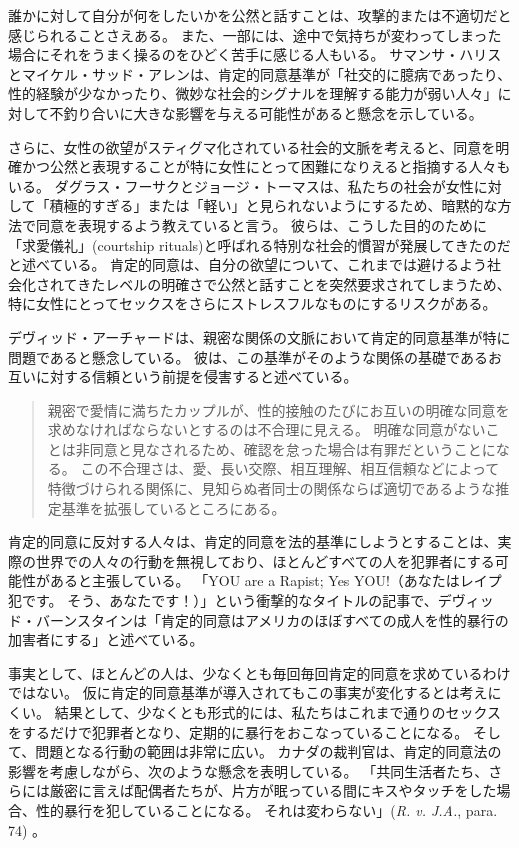 \documentclass[paper=a4,book,openany]{jlreq}
\newcommand{\ig}[1]{}           %
\begin{document}
誰かに対して自分が何をしたいかを公然と話すことは、攻撃的または不適切だと感じられることさえある。
また、一部には、途中で気持ちが変わってしまった場合にそれをうまく操るのをひどく苦手に感じる人もいる。
サマンサ・ハリス\ig{Samantha Harris}とマイケル・サッド・アレン\ig{Michael Thad Allen}は、肯定的同意基準が「社交的に臆病であったり、性的経験が少なかったり、微妙な社会的シグナルを理解する能力が弱い人々」に対して不釣り合いに大きな影響を与える可能性があると懸念を示している\citep{harris20:_bad_vibrat}。

さらに、女性の欲望がスティグマ化されている社会的文脈を考えると、同意を明確かつ公然と表現することが特に女性にとって困難になりえると指摘する人々もいる。
ダグラス・フーサク\ig{Douglas Husak}とジョージ・トーマス\ig{George C. Thomas}は、私たちの社会が女性に対して「積極的すぎる」または「軽い」と見られないようにするため、暗黙的な方法で同意を表現するよう教えていると言う。
彼らは、こうした目的のために「求愛儀礼」(courtship rituals)と呼ばれる特別な社会的慣習が発展してきたのだと述べている。
肯定的同意は、自分の欲望について、これまでは避けるよう社会化されてきたレベルの明確さで公然と話すことを突然要求されてしまうため、特に女性にとってセックスをさらにストレスフルなものにするリスクがある\citep{husak92:_date}。

デヴィッド・アーチャードは、親密な関係の文脈において肯定的同意基準が特に問題であると懸念している。
彼は、この基準がそのような関係の基礎であるお互いに対する信頼という前提を侵害すると述べている。

\begin{quote}
親密で愛情に満ちたカップルが、性的接触のたびにお互いの明確な同意を求めなければならないとするのは不合理に見える。
明確な同意がないことは非同意と見なされるため、確認を怠った場合は有罪だということになる。
この不合理さは、愛、長い交際、相互理解、相互信頼などによって特徴づけられる関係に、見知らぬ者同士の関係ならば適切であるような推定基準を拡張しているところにある。
\citep[p.146]{archard98:_sexual_consen}
\end{quote}

肯定的同意に反対する人々は、肯定的同意を法的基準にしようとすることは、実際の世界での人々の行動を無視しており、ほとんどすべての人を犯罪者にする可能性があると主張している。
「YOU are a Rapist; Yes YOU!（あなたはレイプ犯です。
そう、あなたです！）」という衝撃的なタイトルの記事で、デヴィッド・バーンスタイン\ig{David Bernstein}は「肯定的同意はアメリカのほぼすべての成人を性的暴行の加害者にする」と述べている\citep{bernstein14:_you_are_rapis}。
\ig{David Bernstein}
事実として、ほとんどの人は、少なくとも毎回毎回肯定的同意を求めているわけではない。
仮に肯定的同意基準が導入されてもこの事実が変化するとは考えにくい。
結果として、少なくとも形式的には、私たちはこれまで通りのセックスをするだけで犯罪者となり、定期的に暴行をおこなっていることになる。
そして、問題となる行動の範囲は非常に広い。
カナダの裁判官は、肯定的同意法の影響を考慮しながら、次のような懸念を表明している。
「共同生活者たち、さらには厳密に言えば配偶者たちが、片方が眠っている間にキスやタッチをした場合、性的暴行を犯していることになる。
それは変わらない」(\emph{R. v. J.A.}, \ig{2011 SCC 28,} para. 74\ig{\footnote{\url{https://scc-csc.lexum.com/scc-csc/scc-csc/en/item/7942/index.do}.}}) 。
\end{document}
